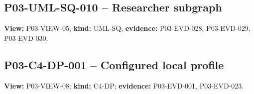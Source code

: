 \documentclass[10pt,letterpaper]{article}
\begin{document}
\subsection{P03-UML-SQ-010 -- Researcher subgraph}
\textbf{View:} P03-VIEW-05; \textbf{kind:} UML-SQ; \textbf{evidence:} P03-EVD-028, P03-EVD-029, P03-EVD-030.\par
{}
\clearpage

\subsection{P03-C4-DP-001 -- Configured local profile}
\textbf{View:} P03-VIEW-08; \textbf{kind:} C4-DP; \textbf{evidence:} P03-EVD-001, P03-EVD-023.\par
{}

\clearpage
\end{document}
